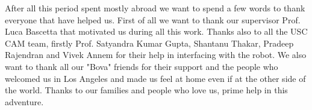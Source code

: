 After all this period spent mostly abroad we want to spend a few words to thank everyone that have helped us. First of all we want to thank our supervisor Prof. Luca Bascetta that motivated us during all this work. Thanks also to all the USC CAM team, firstly Prof. Satyandra Kumar Gupta, Shantanu Thakar, Pradeep Rajendran and Vivek Annem for their help in interfacing with the robot.
We also want to thank all our "Bova" friends for their support and the people who welcomed us in Los Angeles and made us feel at home even if at the other side of the world. Thanks to our families and people who love us, prime help in this adventure.






